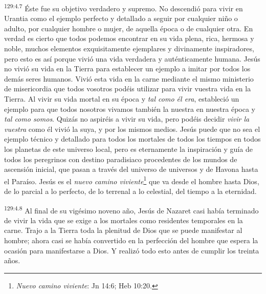 \par
\textsuperscript{129:4.7} Éste fue su objetivo verdadero y supremo. No descendió para vivir en Urantia como el ejemplo perfecto y detallado a seguir por cualquier niño o adulto, por cualquier hombre o mujer, de aquella época o de cualquier otra. En verdad es cierto que todos podemos encontrar en su vida plena, rica, hermosa y noble, muchos elementos exquisitamente ejemplares y divinamente inspiradores, pero esto es así porque vivió una vida verdadera y auténticamente humana. Jesús no vivió su vida en la Tierra para establecer un ejemplo a imitar por todos los demás seres humanos. Vivió esta vida en la carne mediante el mismo ministerio de misericordia que todos vosotros podéis utilizar para vivir vuestra vida en la Tierra. Al vivir su vida mortal en su época y \textit{tal como él era}, estableció un ejemplo para que todos nosotros vivamos también la nuestra en nuestra época y \textit{tal como somos}. Quizás no aspiréis a vivir su vida, pero podéis decidir \textit{vivir la vuestra} como él vivió la suya, y por los mismos medios. Jesús puede que no sea el ejemplo técnico y detallado para todos los mortales de todos los tiempos en todos los planetas de este universo local, pero es eternamente la inspiración y guía de todos los peregrinos con destino paradisiaco procedentes de los mundos de ascensión inicial, que pasan a través del universo de universos y de Havona hasta el Paraíso. Jesús es el \textit{nuevo camino viviente}\footnote{\textit{Nuevo camino viviente}: Jn 14:6; Heb 10:20.} que va desde el hombre hasta Dios, de lo parcial a lo perfecto, de lo terrenal a lo celestial, del tiempo a la eternidad.

\par
\textsuperscript{129:4.8} Al final de su vigésimo noveno año, Jesús de Nazaret casi había terminado de vivir la vida que se exige a los mortales como residentes temporales en la carne. Trajo a la Tierra toda la plenitud de Dios que se puede manifestar al hombre; ahora casi se había convertido en la perfección del hombre que espera la ocasión para manifestarse a Dios. Y realizó todo esto antes de cumplir los treinta años.